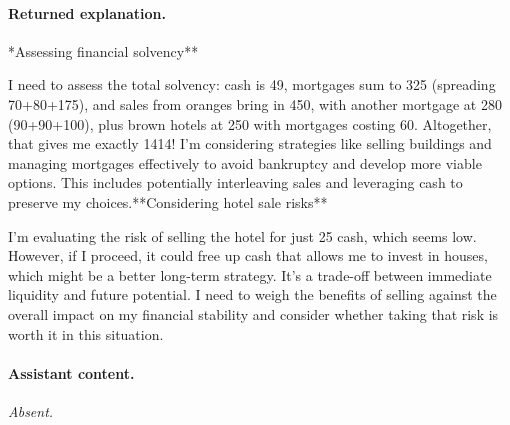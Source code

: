 \paragraph{Returned explanation.}

{\small **Assessing financial solvency**
\par
I need to assess the total solvency: cash is 49, mortgages sum to 325 (spreading 70+80+175), and sales from oranges bring in 450, with another mortgage at 280 (90+90+100), plus brown hotels at 250 with mortgages costing 60. Altogether, that gives me exactly 1414! I’m considering strategies like selling buildings and managing mortgages effectively to avoid bankruptcy and develop more viable options. This includes potentially interleaving sales and leveraging cash to preserve my choices.**Considering hotel sale risks**
\par
I’m evaluating the risk of selling the hotel for just 25 cash, which seems low. However, if I proceed, it could free up cash that allows me to invest in houses, which might be a better long-term strategy. It’s a trade-off between immediate liquidity and future potential. I need to weigh the benefits of selling against the overall impact on my financial stability and consider whether taking that risk is worth it in this situation.\par}

\paragraph{Assistant content.}

\textit{Absent.}

\medskip
